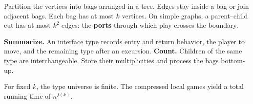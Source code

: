 
Partition the vertices into bags arranged in a tree. Edges stay inside
a bag or join adjacent bags. Each bag has at most $k$ vertices.
\PosterPara
On simple graphs, a parent--child cut has at most $k^2$ edges:
the \textbf{ports} through which play crosses the boundary.



\textbf{Summarize.} An interface type records entry and return behavior,
the player to move, and the remaining type after an excursion.
\PosterPara
\textbf{Count.} Children of the same type are interchangeable.
Store their multiplicities and process the bags bottom-up.
\PosterPara
{\PosterSmallFont\color{PosterMuted}
  For fixed $k$, the type universe is finite. The compressed local games
  yield a total running time of $n^{f(k)}$.
  \par}
